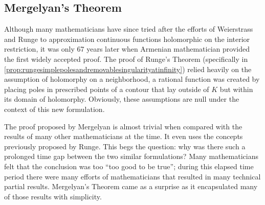 \subsection{Mergelyan's Theorem}
Although many mathematicians have since tried after the efforts of Weierstrass and Runge to approximation continuous functions holomorphic on the interior restriction, it was only 67 years later when Armenian mathematician provided the first widely accepted proof. The proof of Runge's Theorem (specifically in \cref{prop:rungesimplepolesandremovablesingularityatinfinity}) relied heavily on the assumption of holomorphy on a neighborhood, a rational function was created by placing poles in prescribed points of a contour that lay outside of \(K\) but within its domain of holomorphy. Obviously, these assumptions are null under the context of this new formulation.

The proof proposed by Mergelyan is almost trivial when compared with the results of many other mathematicians at the time. It even uses the concepts previously proposed by Runge. This begs the question: why was there such a prolonged time gap between the two similar formulations? Many mathematicians felt that the conclusion was too ``too good to be true''; during this elapsed time period there were many efforts of mathematicians that resulted in many technical partial results. Mergelyan's Theorem came as a surprise as it encapsulated many of those results with simplicity.

